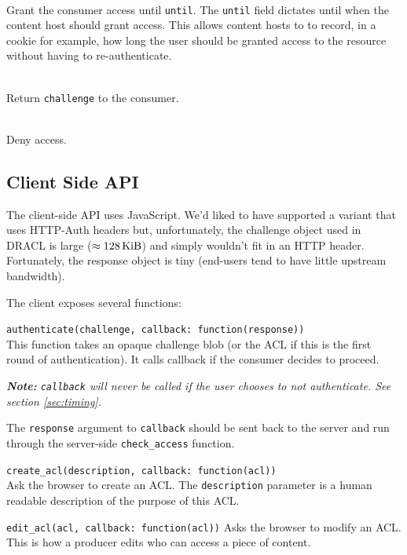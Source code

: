\documentclass[pdftex,12pt,a4papaer,twoside,notitlepage]{report}
\newcommand{\note}[1]{\vspace{1em} \begin{spacing}{1}\textit{\textbf{Note:} #1}\end{spacing}\vspace{1em}}
\begin{document}
\begin{appendices}
\begin{compactitem}[$\lambda$]
 \begin{description}[labelindent=2em,leftmargin=4em]
 \item[\texttt{Grant(until)}] \hfill \\
   Grant the consumer access until \texttt{until}. The \texttt{until} field
   dictates until when the content host should grant access. This allows content
   hosts to to record, in a cookie for example, how long the user should be
   granted access to the resource without having to re-authenticate.
 \item[\texttt{Continue(challenge)}] \hfill \\
   Return \texttt{challenge} to the consumer.
 \item[\texttt{Deny}] \hfill \\
   Deny access.
 \end{description}
\end{compactitem}

\subsection{Client Side API}

The client-side API uses JavaScript. We'd liked to have supported a variant that
uses HTTP-Auth headers but, unfortunately, the challenge object used in DRACL is
large ($\approx\unit[128]{KiB}$) and simply wouldn't fit in an HTTP header.
Fortunately, the response object is tiny (end-users tend to have little upstream
bandwidth).

The client exposes several functions:

\begin{compactitem}[$\lambda$]
\item \verb=authenticate(challenge, callback: function(response))= \\
  This function takes an opaque challenge blob (or the ACL if this is the first
  round of authentication). It calls callback if the consumer decides to
  proceed.

  \note{\texttt{callback} will never be called if the user chooses to not
    authenticate. See section \cref{sec:timing}.}

  The \texttt{response} argument to \texttt{callback} should be sent back to the
  server and run through the server-side \texttt{check\_access} function.
\item \verb=create_acl(description, callback: function(acl))= \\
  Ask the browser to create an ACL. The \texttt{description} parameter is a human
  readable description of the purpose of this ACL.
\item \verb=edit_acl(acl, callback: function(acl))=
  Asks the browser to modify an ACL. This is how a producer edits who can access
  a piece of content.
\end{compactitem}


\end{appendices}
\end{document}

